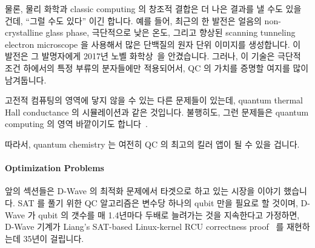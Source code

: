 물론, 물리 화학과 classic computing 의 창조적 결합은 더 나은
결과를 낼 수도 있을 건데, ``그럴 수도 있다'' 이긴 합니다.
예를 들어, 최근의 한 발전은 얼음의 non-crystalline glass phase, 극단적으로 낮은
온도, 그리고 향상된 scanning tunneling electron microscope 을 사용해서 많은
단백질의 원자 단위 이미지를 생성합니다.
이 발전은 그 발명자에게 2017년 노벨
화학상~\cite{NobelPrizeChemistry2017,JohnTimmer2017ChemistryNobel}을
안겼습니다.
그러나, 이 기술은 극단적 조건 하에서의 특정 부류의 분자들에만 적용되어서, QC 의
가치를 증명할 여지를 많이 남겨둡니다.

고전적 컴퓨팅의 영역에 닿지 않을 수 있는 다른 문제들이 있는데, quantum thermal
Hall conductance 의 시뮬레이션과 같은 것입니다.
불행히도, 그런 문제들은 quantum computing 의 영역 바깥이기도
합니다~\cite{ZoharRingel2017QuantizedGravityHall,RichardChirwin2017ThermalHallConductance}.

따라서, quantum chemistry 는 여전히 QC 의 최고의 킬러 앱이 될 수 있을 겁니다.

\paragraph{Optimization Problems}
\label{sec:future:Optimization Problems}

앞의 섹션들은 D-Wave 의 최적화 문제에서 타겟으로 하고 있는 시장을 이야기
했습니다.
SAT 를 풀기 위한 QC 알고리즘은 변수당 하나의 qubit 만을 필요로 할 것이며,
D-Wave 가 qubit 의 갯수를 매 1.4년마다 두배로 늘려가는 것을 지속한다고
가정하면, D-Wave 기계가 Liang's SAT-based Linux-kernel RCU correctness
proof~\cite{LihaoLiang2016VerifyTreeRCU} 를 재현하는데 35년이 걸립니다.
\iffalse

